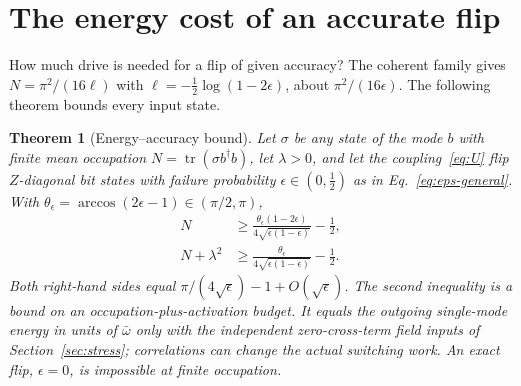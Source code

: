 \documentclass[aps,pre,onecolumn,superscriptaddress,floatfix,longbibliography]{revtex4-2}
\newtheorem{theorem}{Theorem}
\begin{document}
\section{The energy cost of an accurate flip}
\label{sec:energy}

How much drive is needed for a flip of given accuracy? The coherent family gives $N=\pi^2/(16\ell)$ with $\ell=-\tfrac12\log(1-2\epsilon)$, about $\pi^2/(16\epsilon)$. The following theorem bounds every input state.

\begin{theorem}[Energy--accuracy bound]
\label{thm:energy}
Let $\sigma$ be any state of the mode $b$ with finite mean occupation $N=\operatorname{tr}(\sigma b^\dagger b)$, let $\lambda>0$, and let the coupling~\eqref{eq:U} flip $Z$-diagonal bit states with failure probability $\epsilon\in(0,\tfrac12)$ as in Eq.~\eqref{eq:eps-general}. With $\theta_\epsilon=\arccos(2\epsilon-1)\in(\pi/2,\pi)$,
\begin{align}
N&\ge\frac{\theta_\epsilon(1-2\epsilon)}{4\sqrt{\epsilon(1-\epsilon)}}-\frac12,\label{eq:boundN}\\
N+\lambda^2&\ge\frac{\theta_\epsilon}{4\sqrt{\epsilon(1-\epsilon)}}-\frac12.\label{eq:boundNW}
\end{align}
Both right-hand sides equal $\pi/(4\sqrt\epsilon)-1+O(\sqrt\epsilon)$. The second inequality is a bound on an occupation-plus-activation budget. It equals the outgoing single-mode energy in units of $\bar\omega$ only with the independent zero-cross-term field inputs of Section~\ref{sec:stress}; correlations can change the actual switching work. An exact flip, $\epsilon=0$, is impossible at finite occupation.
\end{theorem}
\end{document}
